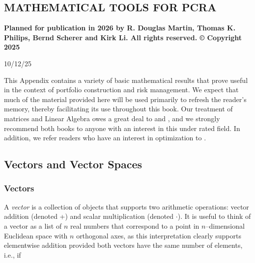 \documentclass[graybox,envcountchap,sectrefs]{svmono}\usepackage[]{graphicx}\usepackage[]{xcolor}
\begin{document}
\begin{appendices}


\setcounter{chapter}{0} 

\chapter{MATHEMATICAL TOOLS FOR PCRA\label{chap:AppendixA}}

\vspace{0.3in}

\textbf{Planned for publication in 2026 by R. Douglas Martin, Thomas
K. Philips, Bernd Scherer and Kirk Li. All rights reserved. © Copyright
2025}

\vspace{0.3in}

\begin{center}
10/12/25
\par\end{center}

\tocchpnum=30pt 
\tocsecnum=33pt 
\tocsubsecnum=40pt 
\tocsubsubsecnum=48pt 
\tocparanum=55pt 
\tocsubparanum=63pt
\calctocindent

\tableofcontents{}\newpage{}

This Appendix contains a variety of basic mathematical results that
prove useful in the context of portfolio construction and risk management.
We expect that much of the material provided here will be used primarily
to refresh the reader's memory, thereby facilitating its use throughout
this book. Our treatment of matrices and Linear Algebra owes a great
deal to \citet{Gentle2017} and \citet{Strang2016}, and we strongly
recommend both books to anyone with an interest in this under rated
field. In addition, we refer readers who have an interest in optimization
to \citet{LuenbergerYe2008}.

\section{Vectors and Vector Spaces}

\subsection{Vectors}

A \emph{vector} is a collection of objects that supports two arithmetic
operations: vector addition (denoted +) and scalar multiplication
(denoted $\cdot$). It is useful to think of a vector as a list of
$n$ real numbers that correspond to a point in $n$--dimensional
Euclidean space with $n$ orthogonal axes, as this interpretation
clearly supports elementwise addition provided both vectors have the
same number of elements, i.e., if


\end{appendices}
\end{document}
